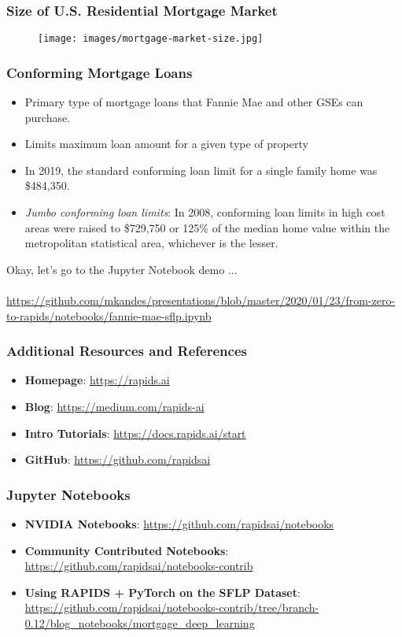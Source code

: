 \documentclass{beamer}
\begin{document}
\begin{frame}
   \frametitle{Size of U.S. Residential Mortgage Market}
   \begin{figure}[htbp]
      \texttt{[image: images/mortgage-market-size.jpg]}
   \end{figure}
\end{frame}

\begin{frame}
   \frametitle{Conforming Mortgage Loans}
   \begin{itemize}\setlength\itemsep{1.0em}
      \item Primary type of mortgage loans that Fannie Mae and other 
         GSEs can purchase.
      \item Limits maximum loan amount for a given type of property
      \item In 2019, the standard conforming loan limit for a single 
         family home was \$484,350. 
      \item \textit{Jumbo conforming loan limits}: In 2008, conforming 
         loan limits in high cost areas were raised to \$729,750 or 
         125\% of the median home value within the metropolitan
         statistical area, whichever is the lesser.
   \end{itemize}
\end{frame}

\begin{frame}
   Okay, let's go to the Jupyter Notebook demo ...
   \\ \ \\
   \url{https://github.com/mkandes/presentations/blob/master/2020/01/23/from-zero-to-rapids/notebooks/fannie-mae-sflp.ipynb}
\end{frame}

\begin{frame}
   \frametitle{Additional Resources and References}
   \begin{itemize}\setlength\itemsep{1.5em}
      \item \textbf{Homepage}: \url{https://rapids.ai}
      \item \textbf{Blog}: \url{https://medium.com/rapids-ai}
      \item \textbf{Intro Tutorials}: \url{https://docs.rapids.ai/start}
      \item \textbf{GitHub}: \url{https://github.com/rapidsai}
   \end{itemize}
\end{frame}

\begin{frame}
   \frametitle{Jupyter Notebooks}
   \begin{itemize}\setlength\itemsep{1.5em}
      \item \textbf{NVIDIA Notebooks}: \url{https://github.com/rapidsai/notebooks}
      \item \textbf{Community Contributed Notebooks}: \url{https://github.com/rapidsai/notebooks-contrib}
      \item \textbf{Using RAPIDS + PyTorch on the SFLP Dataset}: \url{https://github.com/rapidsai/notebooks-contrib/tree/branch-0.12/blog_notebooks/mortgage_deep_learning}
   \end{itemize}
\end{frame}
\end{document}
